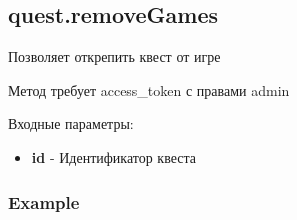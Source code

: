 \subsection{quest.removeGames}

Позволяет открепить квест от игре

Метод требует access\_token с правами admin

Входные параметры:
\begin{itemize}
  \item \textbf{id} - Идентификатор квеста
\end{itemize}

\subsubsection{Example}
\begin{Verbatim}[frame=single]

\end{Verbatim}